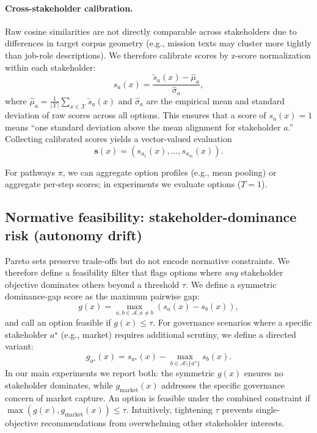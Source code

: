 \documentclass{article}
\begin{document}
\paragraph{Cross-stakeholder calibration.}
Raw cosine similarities are not directly comparable across stakeholders due to differences in target corpus geometry (e.g., mission texts may cluster more tightly than job-role descriptions). We therefore calibrate scores by z-score normalization within each stakeholder:
\begin{equation}
  s_a(x) = \frac{\tilde{s}_a(x) - \hat{\mu}_a}{\hat{\sigma}_a},
\end{equation}
where $\hat{\mu}_a = \frac{1}{|\mathcal{X}|}\sum_{x \in \mathcal{X}} \tilde{s}_a(x)$ and $\hat{\sigma}_a$ are the empirical mean and standard deviation of raw scores across all options. This ensures that a score of $s_a(x) = 1$ means ``one standard deviation above the mean alignment for stakeholder $a$.''
Collecting calibrated scores yields a vector-valued evaluation
\begin{equation}
  \mathbf{s}(x) = (s_{a_1}(x),\dots,s_{a_m}(x)).
\end{equation}

For pathways $\pi$, we can aggregate option profiles (e.g., mean pooling) or aggregate per-step scores; in experiments we evaluate options ($T=1$).

\subsection{Normative feasibility: stakeholder-dominance risk (autonomy drift)}
\label{subsec:constraint}
Pareto sets preserve trade-offs but do not encode normative constraints. We therefore define a feasibility filter that flags options where \emph{any} stakeholder objective dominates others beyond a threshold $\tau$.
We define a symmetric dominance-gap score as the maximum pairwise gap:
\begin{equation}
  g(x) = \max_{a,b \in \mathcal{A}, a \neq b} \left( s_a(x) - s_b(x) \right),
\end{equation}
and call an option feasible if $g(x) \le \tau$. For governance scenarios where a specific stakeholder $a^\star$ (e.g., market) requires additional scrutiny, we define a directed variant:
\begin{equation}
  g_{a^\star}(x) = s_{a^\star}(x) - \max_{b\in\mathcal{A}\setminus\{a^\star\}} s_b(x).
\end{equation}
In our main experiments we report both: the symmetric $g(x)$ ensures no stakeholder dominates, while $g_{\text{market}}(x)$ addresses the specific governance concern of market capture. An option is feasible under the combined constraint if $\max(g(x), g_{\text{market}}(x)) \le \tau$.
Intuitively, tightening $\tau$ prevents single-objective recommendations from overwhelming other stakeholder interests.
\end{document}
